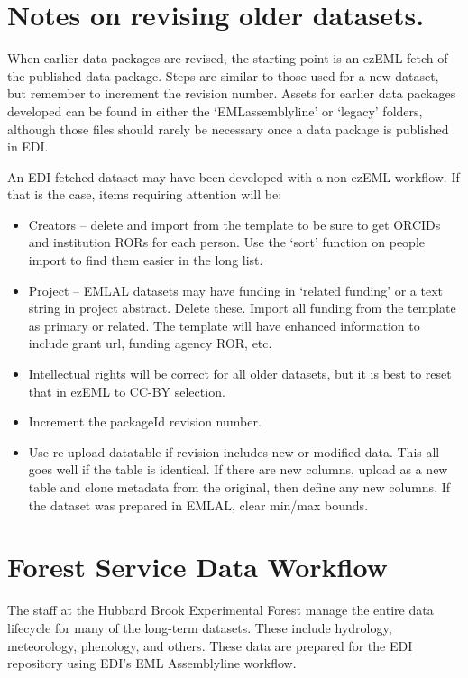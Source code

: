 \documentclass[
  letterpaper,
  DIV=11,
  numbers=noendperiod]{scrreprt}
\providecommand{\tightlist}{%
  \setlength{\itemsep}{0pt}\setlength{\parskip}{0pt}}\usepackage{longtable,booktabs,array}
\begin{document}
\section{Notes on revising older
datasets.}\label{notes-on-revising-older-datasets.}

When earlier data packages are revised, the starting point is an ezEML
fetch of the published data package. Steps are similar to those used for
a new dataset, but remember to increment the revision number. Assets for
earlier data packages developed can be found in either the
`EMLassemblyline' or `legacy' folders, although those files should
rarely be necessary once a data package is published in EDI.

An EDI fetched dataset may have been developed with a non-ezEML
workflow. If that is the case, items requiring attention will be:

\begin{itemize}
\tightlist
\item
  Creators -- delete and import from the template to be sure to get
  ORCIDs and institution RORs for each person. Use the `sort' function
  on people import to find them easier in the long list.
\item
  Project -- EMLAL datasets may have funding in `related funding' or a
  text string in project abstract. Delete these. Import all funding from
  the template as primary or related. The template will have enhanced
  information to include grant url, funding agency ROR, etc.
\item
  Intellectual rights will be correct for all older datasets, but it is
  best to reset that in ezEML to CC-BY selection.
\item
  Increment the packageId revision number.
\item
  Use re-upload datatable if revision includes new or modified data.
  This all goes well if the table is identical. If there are new
  columns, upload as a new table and clone metadata from the original,
  then define any new columns. If the dataset was prepared in EMLAL,
  clear min/max bounds.
\end{itemize}

\section{Forest Service Data
Workflow}\label{forest-service-data-workflow}

The staff at the Hubbard Brook Experimental Forest manage the entire
data lifecycle for many of the long-term datasets. These include
hydrology, meteorology, phenology, and others. These data are prepared
for the EDI repository using EDI's EML Assemblyline workflow.
\end{document}
